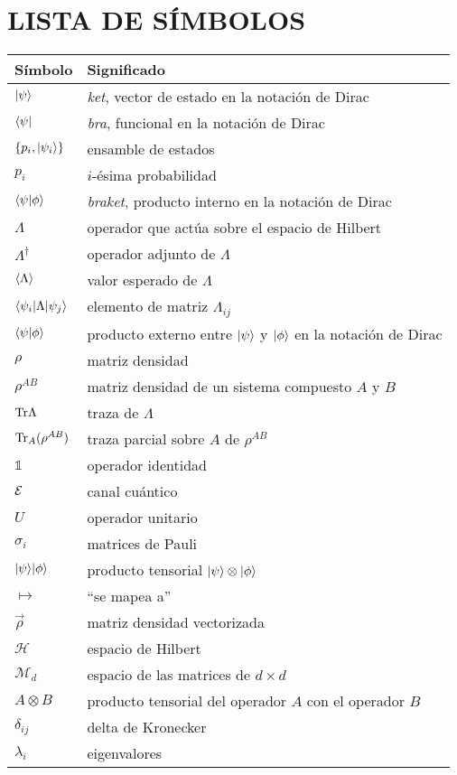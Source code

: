 


\chapter{LISTA DE SÍMBOLOS}

\begin{longtable}{@{}l@{\extracolsep{\fill}} p{4.75in} @{}}  %
  \textsf{Símbolo} & \textsf{Significado}\\[12pt]
  \endhead{}
 $|\psi\rangle$ &  \textit{ket}, vector de estado en la notación de Dirac \\
  $\langle\psi|$ & \textit{bra}, funcional en la notación de Dirac\\
  $\{p_i,|\psi_i\rangle\}$ & ensamble de estados \\
  $p_i$ & $i$-ésima probabilidad\\
  $\langle\psi|\phi\rangle$ & \textit{braket}, producto interno en la notación de Dirac\\
  $\Lambda$ &  operador que actúa sobre el espacio de Hilbert\\
  $\Lambda^{\dagger}$ & operador adjunto de $\Lambda$\\
  $\langle{\Lambda}\rangle$ & valor esperado de $\Lambda$\\
  $\langle\psi_i|\Lambda|\psi_j\rangle$ & elemento de matriz $\Lambda_{ij}$\\
  $\langle \psi|\phi \rangle $ & producto externo entre $|\psi\rangle$ y $|\phi\rangle$ en la notación de Dirac \\
  $\rho$ & matriz densidad\\
  $\rho^{AB}$ & matriz densidad de un sistema compuesto $A$ y $B$\\
  ${\rm Tr} \Lambda$ & traza de $\Lambda$\\
  ${\rm Tr}_{A}(\rho^{AB})$ & traza parcial sobre $A$ de $\rho^{AB}$\\
  $\mathds{1}$ & operador identidad \\
  $\mathcal{E}$ & canal cuántico \\
  $U$ & operador unitario \\
  $\sigma_i$ & matrices de Pauli\\
  $| \psi\rangle|\phi\rangle$ & producto tensorial $|\psi\rangle\otimes|\phi\rangle$\\
  $\mapsto$ & ``se mapea a''\\
  $\vec\rho$ & matriz densidad vectorizada\\
  $\mathcal{H}$ & espacio de Hilbert\\
  $\mathcal{M}_d$ & espacio de las matrices de $d\times d$\\
  $A{\otimes} B$  & producto tensorial del operador $A$ con el operador $B$\\
  $\delta_{ij}$ & delta de Kronecker\\
 $\lambda_i$ & eigenvalores
\end{longtable}
